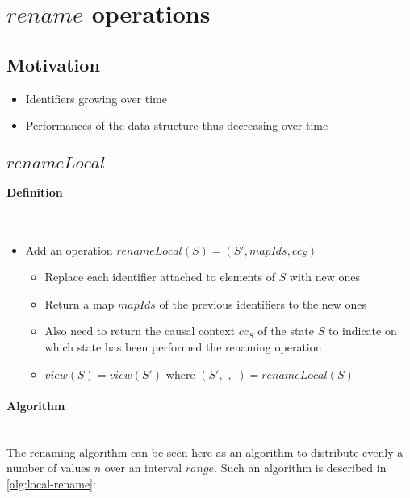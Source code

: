 \documentclass[a4paper]{article}
\begin{document}
\section{$rename$ operations}

\subsection{Motivation}

\begin{itemize}
  \item Identifiers growing over time
  \item Performances of the data structure thus decreasing over time
\end{itemize}

\subsection{$renameLocal$}

\paragraph{Definition}~\\

\begin{itemize}
  \item Add an operation $renameLocal(S) = (S', mapIds, cc_S)$
  \begin{itemize}
    \item Replace each identifier attached to elements of $S$ with new ones
    \item Return a map $mapIds$ of the previous identifiers to the new ones
    \item Also need to return the causal context $cc_S$ of the state $S$
      to indicate on which state has been performed the renaming operation
    \item $view(S) = view(S')$ where $(S', \_, \_) = renameLocal(S)$
  \end{itemize}
\end{itemize}

\paragraph{Algorithm}~\\

The renaming algorithm can be seen here as an algorithm
to distribute evenly a number of values $n$ over an interval $range$.
Such an algorithm is described in \ref{alg:local-rename}:
\end{document}
